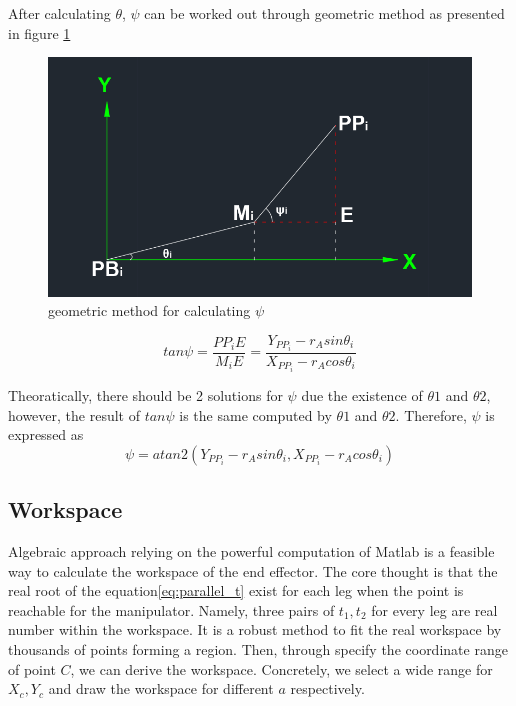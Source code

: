 \documentclass{article}
\begin{document}
After calculating $\theta$, $\psi$ can be worked out through geometric method as presented in figure \ref{fig:Parallel_psi}
\begin{figure}[htbp] 
\begin{center}
\includegraphics[width=\textwidth]{images/Parallel_psi}
\caption{geometric method for calculating $\psi$}
\label{fig:Parallel_psi}
\end{center}
\end{figure}

\begin{equation}
tan\psi = \frac{PP_iE}{M_iE}=\frac{Y_{PP_i}-r_Asin\theta_i}{X_{PP_i}-r_Acos\theta_i}
\end{equation}

Theoratically, there should be 2 solutions for $\psi$ due the existence of $\theta1$ and $\theta2$, however, the result of $tan\psi$ is the same computed by $\theta1$ and $\theta2$. Therefore, $\psi$ is expressed as
\begin{equation}
\psi = atan2(Y_{PP_i}-r_Asin\theta_i,X_{PP_i}-r_Acos\theta_i )
\end{equation}

\subsection{Workspace}
Algebraic approach relying on the powerful computation of Matlab is a feasible way to calculate the workspace of the end effector. The core thought is that the real root of the equation\ref{eq:parallel_t} exist for each leg when the point is reachable for the manipulator. Namely, three pairs of $t_1,t_2$ for every leg are real number within the workspace. It is a robust method to fit the real workspace by thousands of points forming a region. Then, through specify the coordinate range of point $C$, we can derive the workspace. Concretely, we select a wide range for $X_c,Y_c$ and draw the workspace for different $a$ respectively.
 
\end{document}
